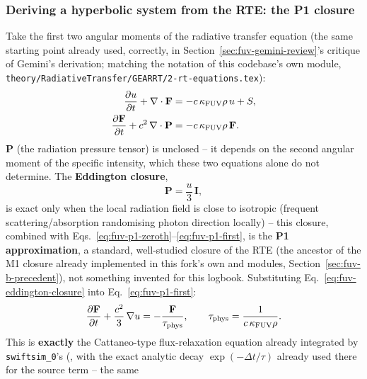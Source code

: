\subsubsection{Deriving a hyperbolic system from the RTE: the P1
closure}
\label{sec:fuv-b-p1}

Take the first two angular moments of the radiative transfer equation
(the same starting point already used, correctly, in
Section~\ref{sec:fuv-gemini-review}'s critique of Gemini's derivation;
matching the notation of this codebase's own  module,
\texttt{theory/RadiativeTransfer/GEARRT/2-rt-equations.tex}):
\begin{align}
  \frac{\partial u}{\partial t} + \nabla\cdot\mathbf F
    &= -c\,\kappa_{\rm FUV}\rho\, u + S ,
  \label{eq:fuv-p1-zeroth} \\
  \frac{\partial \mathbf F}{\partial t} + c^2\,\nabla\cdot\mathbf P
    &= -c\,\kappa_{\rm FUV}\rho\, \mathbf F .
  \label{eq:fuv-p1-first}
\end{align}
$\mathbf P$ (the radiation pressure tensor) is unclosed -- it depends on
the second angular moment of the specific intensity, which these two
equations alone do not determine. The \textbf{Eddington closure},
\begin{equation}
  \mathbf P = \frac{u}{3}\,\mathbf I ,
  \label{eq:fuv-eddington-closure}
\end{equation}
is exact only when the local radiation field is close to isotropic
(frequent scattering/absorption randomising photon direction locally)
-- this closure, combined with Eqs.~\ref{eq:fuv-p1-zeroth}--\ref{eq:fuv-p1-first},
is the \textbf{P1 approximation}, a standard, well-studied closure of
the RTE (the ancestor of the M1 closure already implemented in this
fork's own  and  modules,
Section~\ref{sec:fuv-b-precedent}), not something invented for this
logbook. Substituting Eq.~\ref{eq:fuv-eddington-closure} into
Eq.~\ref{eq:fuv-p1-first}:
\begin{equation}
  \frac{\partial \mathbf F}{\partial t} + \frac{c^2}{3}\,\nabla u
    = -\frac{\mathbf F}{\tau_{\rm phys}} , \qquad
  \tau_{\rm phys} = \frac{1}{c\,\kappa_{\rm FUV}\rho} .
  \label{eq:fuv-tau-phys}
\end{equation}
This is \textbf{exactly} the Cattaneo-type flux-relaxation equation
already integrated by \texttt{swiftsim\_0}'s
 (, with the exact analytic decay $\exp(-\Delta t/\tau)$
already used there for the source term -- the same

